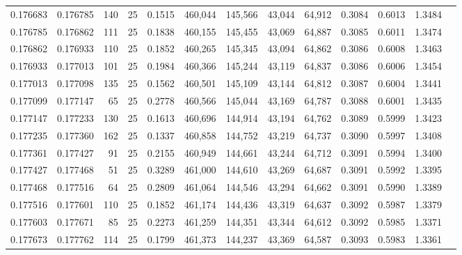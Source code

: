 \begin{tabular}{rrrrrrrrrrrrr}
0.176683 & 0.176785 &   140 &  25 &                                     0.1515 & 460,044 & 145,566 &  43,044 &  64,912 & 0.3084 & 0.6013 & 1.3484 \\
0.176785 & 0.176862 &   111 &  25 &                                     0.1838 & 460,155 & 145,455 &  43,069 &  64,887 & 0.3085 & 0.6011 & 1.3474 \\
0.176862 & 0.176933 &   110 &  25 &                                     0.1852 & 460,265 & 145,345 &  43,094 &  64,862 & 0.3086 & 0.6008 & 1.3463 \\
0.176933 & 0.177013 &   101 &  25 &                                     0.1984 & 460,366 & 145,244 &  43,119 &  64,837 & 0.3086 & 0.6006 & 1.3454 \\
0.177013 & 0.177098 &   135 &  25 &                                     0.1562 & 460,501 & 145,109 &  43,144 &  64,812 & 0.3087 & 0.6004 & 1.3441 \\
0.177099 & 0.177147 &    65 &  25 &                                     0.2778 & 460,566 & 145,044 &  43,169 &  64,787 & 0.3088 & 0.6001 & 1.3435 \\
0.177147 & 0.177233 &   130 &  25 &                                     0.1613 & 460,696 & 144,914 &  43,194 &  64,762 & 0.3089 & 0.5999 & 1.3423 \\
0.177235 & 0.177360 &   162 &  25 &                                     0.1337 & 460,858 & 144,752 &  43,219 &  64,737 & 0.3090 & 0.5997 & 1.3408 \\
0.177361 & 0.177427 &    91 &  25 &                                     0.2155 & 460,949 & 144,661 &  43,244 &  64,712 & 0.3091 & 0.5994 & 1.3400 \\
0.177427 & 0.177468 &    51 &  25 &                                     0.3289 & 461,000 & 144,610 &  43,269 &  64,687 & 0.3091 & 0.5992 & 1.3395 \\
0.177468 & 0.177516 &    64 &  25 &                                     0.2809 & 461,064 & 144,546 &  43,294 &  64,662 & 0.3091 & 0.5990 & 1.3389 \\
0.177516 & 0.177601 &   110 &  25 &                                     0.1852 & 461,174 & 144,436 &  43,319 &  64,637 & 0.3092 & 0.5987 & 1.3379 \\
0.177603 & 0.177671 &    85 &  25 &                                     0.2273 & 461,259 & 144,351 &  43,344 &  64,612 & 0.3092 & 0.5985 & 1.3371 \\
0.177673 & 0.177762 &   114 &  25 &                                     0.1799 & 461,373 & 144,237 &  43,369 &  64,587 & 0.3093 & 0.5983 & 1.3361 \\

\end{tabular}
